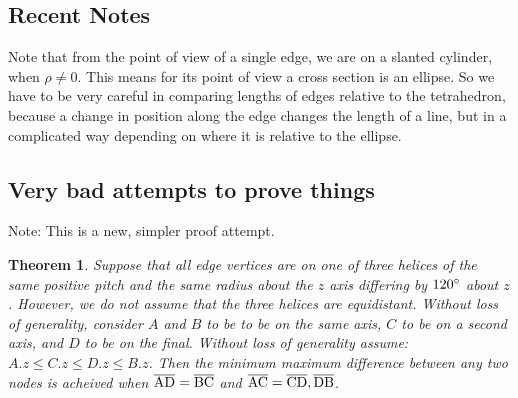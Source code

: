\documentclass[11pt]{article}
\newtheorem{theorem}{Theorem}
\begin{document}
 \subsection{Recent Notes}

 Note that from the point of view of a single edge, we are on a slanted cylinder, when $\rho \neq 0$.
 This means for its point of view a cross section is an ellipse. So we have to be very careful in
 comparing lengths of edges relative to the tetrahedron, because a change in position along the edge
 changes the length of a line, but in a complicated way depending on where it is relative to the ellipse.

 \subsection{Very bad attempts to prove things}

  Note: This is a new, simpler proof attempt.
  \begin{theorem}
    Suppose that all edge vertices are on one of three helices of the same positive pitch and the same radius about the $z$ axis differing by $120\degree$ about $z$.
    However, we do not assume that the three helices are equidistant.
    Without loss of generality, consider $A$ and $B$ to be to be on the same axis, $C$ to be on a second axis, and $D$ to be on the final.
    Without loss of generality assume: $A.z \leq C.z \leq D.z \leq B.z$.
    Then the minimum maximum difference between any two nodes is acheived when
    $ \overline{\rm AD} =  \overline{\rm BC} $ and $ \overline{\rm AC} =  \overline{\rm CD}, \overline{\rm DB} $.
  \end{theorem}
\end{document}
